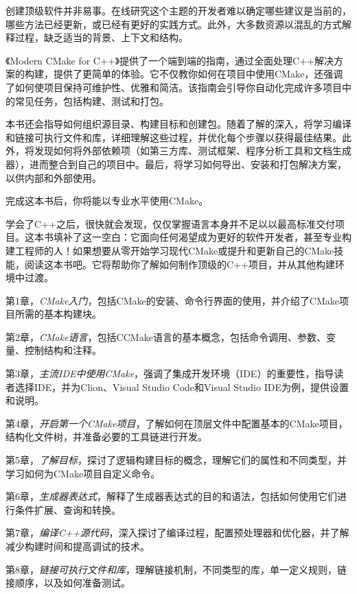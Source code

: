 


创建顶级软件并非易事。在线研究这个主题的开发者难以确定哪些建议是当前的，哪些方法已经更新，或已经有更好的实践方式。此外，大多数资源以混乱的方式解释过程，缺乏适当的背景、上下文和结构。

《Modern CMake for C++》提供了一个端到端的指南，通过全面处理C++解决方案的构建，提供了更简单的体验。它不仅教你如何在项目中使用CMake，还强调了如何使项目保持可维护性、优雅和简洁。该指南会引导你自动化完成许多项目中的常见任务，包括构建、测试和打包。

本书还会指导如何组织源目录、构建目标和创建包。随着了解的深入，将学习编译和链接可执行文件和库，详细理解这些过程，并优化每个步骤以获得最佳结果。此外，将发现如何将外部依赖项（如第三方库、测试框架、程序分析工具和文档生成器），进而整合到自己的项目中。最后，将学习如何导出、安装和打包解决方案，以供内部和外部使用。

完成这本书后，你将能以专业水平使用CMake。


学会了C++之后，很快就会发现，仅仅掌握语言本身并不足以以最高标准交付项目。这本书填补了这一空白：它面向任何渴望成为更好的软件开发者，甚至专业构建工程师的人！如果想要从零开始学习现代CMake或提升和更新自己的CMake技能，阅读这本书吧。它将帮助你了解如何制作顶级的C++项目，并从其他构建环境中过渡。


第1章，\textit{CMake入门}，包括CMake的安装、命令行界面的使用，并介绍了CMake项目所需的基本构建块。

第2章，\textit{CMake语言}，包括CCMake语言的基本概念，包括命令调用、参数、变量、控制结构和注释。

第3章，\textit{主流IDE中使用CMake}，强调了集成开发环境（IDE）的重要性，指导读者选择IDE，并为Clion、Visual Studio Code和Visual Studio IDE为例，提供设置和说明。

第4章，\textit{开启第一个CMake项目}，了解如何在顶层文件中配置基本的CMake项目，结构化文件树，并准备必要的工具链进行开发。

第5章，\textit{了解目标}，探讨了逻辑构建目标的概念，理解它们的属性和不同类型，并学习如何为CMake项目自定义命令。

第6章，\textit{生成器表达式}，解释了生成器表达式的目的和语法，包括如何使用它们进行条件扩展、查询和转换。

第7章，\textit{编译C++源代码}，深入探讨了编译过程，配置预处理器和优化器，并了解减少构建时间和提高调试的技术。

第8章，\textit{链接可执行文件和库}，理解链接机制，不同类型的库，单一定义规则，链接顺序，以及如何准备测试。

